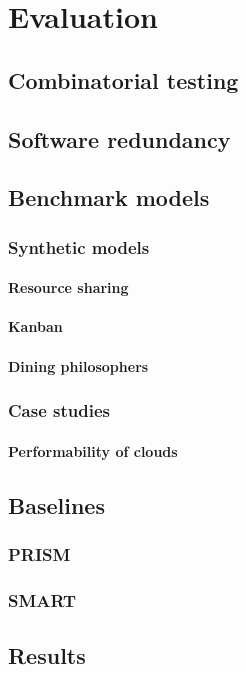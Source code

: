 \chapter{Evaluation}
\label{chap:evaluation}

\section{Combinatorial testing}

\section{Software redundancy}

\section{Benchmark models}

\subsection{Synthetic models}

\subsubsection{Resource sharing}

\subsubsection{Kanban}

\subsubsection{Dining philosophers}

\subsection{Case studies}

\subsubsection{Performability of clouds}

\section{Baselines}

\subsection{PRISM}

\subsection{SMART}

\section{Results}
\label{sec:evaluation:results}